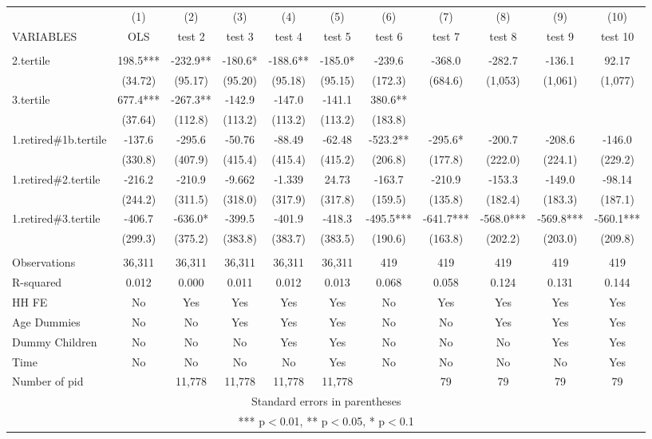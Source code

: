 \begin{tabular}{lcccccccccc} \hline
 & (1) & (2) & (3) & (4) & (5) & (6) & (7) & (8) & (9) & (10) \\
VARIABLES & OLS & test 2 & test 3 & test 4 & test 5 & test 6 & test 7 & test 8 & test 9 & test 10 \\ \hline
 &  &  &  &  &  &  &  &  &  &  \\
2.tertile & 198.5*** & -232.9** & -180.6* & -188.6** & -185.0* & -239.6 & -368.0 & -282.7 & -136.1 & 92.17 \\
 & (34.72) & (95.17) & (95.20) & (95.18) & (95.15) & (172.3) & (684.6) & (1,053) & (1,061) & (1,077) \\
3.tertile & 677.4*** & -267.3** & -142.9 & -147.0 & -141.1 & 380.6** &  &  &  &  \\
 & (37.64) & (112.8) & (113.2) & (113.2) & (113.2) & (183.8) &  &  &  &  \\
1.retired\#1b.tertile & -137.6 & -295.6 & -50.76 & -88.49 & -62.48 & -523.2** & -295.6* & -200.7 & -208.6 & -146.0 \\
 & (330.8) & (407.9) & (415.4) & (415.4) & (415.2) & (206.8) & (177.8) & (222.0) & (224.1) & (229.2) \\
1.retired\#2.tertile & -216.2 & -210.9 & -9.662 & -1.339 & 24.73 & -163.7 & -210.9 & -153.3 & -149.0 & -98.14 \\
 & (244.2) & (311.5) & (318.0) & (317.9) & (317.8) & (159.5) & (135.8) & (182.4) & (183.3) & (187.1) \\
1.retired\#3.tertile & -406.7 & -636.0* & -399.5 & -401.9 & -418.3 & -495.5*** & -641.7*** & -568.0*** & -569.8*** & -560.1*** \\
 & (299.3) & (375.2) & (383.8) & (383.7) & (383.5) & (190.6) & (163.8) & (202.2) & (203.0) & (209.8) \\
 &  &  &  &  &  &  &  &  &  &  \\
Observations & 36,311 & 36,311 & 36,311 & 36,311 & 36,311 & 419 & 419 & 419 & 419 & 419 \\
R-squared & 0.012 & 0.000 & 0.011 & 0.012 & 0.013 & 0.068 & 0.058 & 0.124 & 0.131 & 0.144 \\
HH FE & No & Yes & Yes & Yes & Yes & No & Yes & Yes & Yes & Yes \\
Age Dummies & No & No & Yes & Yes & Yes & No & No & Yes & Yes & Yes \\
Dummy Children & No & No & No & Yes & Yes & No & No & No & Yes & Yes \\
Time & No & No & No & No & Yes & No & No & No & No & Yes \\
 Number of pid &  & 11,778 & 11,778 & 11,778 & 11,778 &  & 79 & 79 & 79 & 79 \\ \hline
\multicolumn{11}{c}{ Standard errors in parentheses} \\
\multicolumn{11}{c}{ *** p$<$0.01, ** p$<$0.05, * p$<$0.1} \\
\end{tabular}
